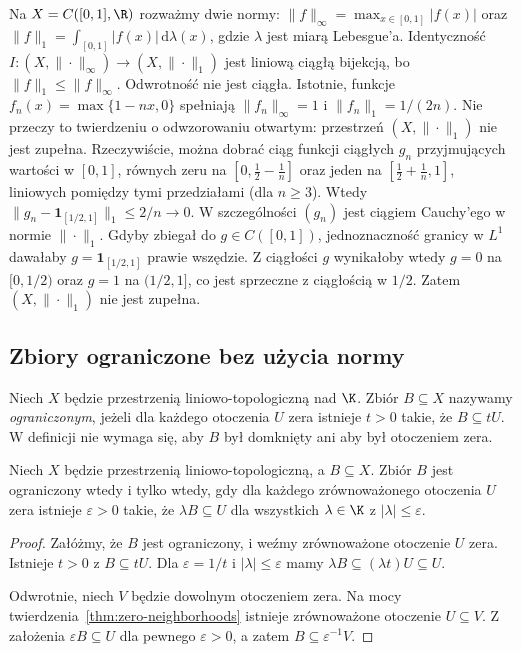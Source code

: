 \begin{przyklad}
Na $X=C([0,1],\R)$ rozważmy dwie normy:
$\|f\|_\infty=\max_{x\in[0,1]}|f(x)|$ oraz
$\|f\|_1=\int_{[0,1]}|f(x)|\,\mathrm d\lambda(x)$,
gdzie $\lambda$ jest miarą Lebesgue'a.
Identyczność $I\colon(X,\|\cdot\|_\infty)\to(X,\|\cdot\|_1)$
jest liniową ciągłą bijekcją, bo $\|f\|_1\leq\|f\|_\infty$.
Odwrotność nie jest ciągła. Istotnie, funkcje
$f_n(x)=\max\{1-nx,0\}$ spełniają $\|f_n\|_\infty=1$
i $\|f_n\|_1=1/(2n)$.
Nie przeczy to twierdzeniu o odwzorowaniu otwartym:
przestrzeń $(X,\|\cdot\|_1)$ nie jest zupełna. Rzeczywiście,
można dobrać ciąg funkcji ciągłych $g_n$ przyjmujących wartości
w $[0,1]$, równych zeru na $[0,\tfrac12-\tfrac1n]$ oraz jeden
na $[\tfrac12+\tfrac1n,1]$, liniowych pomiędzy tymi przedziałami
(dla $n\geq3$). Wtedy
$\|g_n-\mathbf1_{[1/2,1]}\|_1\leq2/n\to0$.
W szczególności $(g_n)$ jest ciągiem Cauchy'ego w normie
$\|\cdot\|_1$. Gdyby zbiegał do $g\in C([0,1])$,
jednoznaczność granicy w $L^1$ dawałaby
$g=\mathbf1_{[1/2,1]}$ prawie wszędzie. Z ciągłości $g$
wynikałoby wtedy $g=0$ na $[0,1/2)$ oraz $g=1$ na
$(1/2,1]$, co jest sprzeczne z ciągłością w $1/2$.
Zatem $(X,\|\cdot\|_1)$ nie jest zupełna.
\end{przyklad}

\subsection{Zbiory ograniczone bez użycia normy}

\begin{definicja}\label{def:tvs-bounded}
Niech $X$ będzie przestrzenią liniowo-topologiczną nad $\K$.
Zbiór $B\subseteq X$ nazywamy \emph{ograniczonym}, jeżeli
dla każdego otoczenia $U$ zera istnieje $t>0$ takie,
że $B\subseteq tU$. W definicji nie wymaga się, aby $B$
był domknięty ani aby był otoczeniem zera.
\end{definicja}

\begin{lemat}\label{lem:bounded-test}
Niech $X$ będzie przestrzenią liniowo-topologiczną, a $B\subseteq X$.
Zbiór $B$ jest ograniczony wtedy i tylko wtedy, gdy dla każdego
zrównoważonego otoczenia $U$ zera istnieje $\varepsilon>0$ takie,
że $\lambda B\subseteq U$ dla wszystkich $\lambda\in\K$
z $|\lambda|\leq\varepsilon$.
\end{lemat}
\begin{proof}
Załóżmy, że $B$ jest ograniczony, i weźmy zrównoważone
otoczenie $U$ zera. Istnieje $t>0$ z $B\subseteq tU$.
Dla $\varepsilon=1/t$ i $|\lambda|\leq\varepsilon$
mamy $\lambda B\subseteq(\lambda t)U\subseteq U$.

Odwrotnie, niech $V$ będzie dowolnym otoczeniem zera.
Na mocy twierdzenia~\ref{thm:zero-neighborhoods} istnieje
zrównoważone otoczenie $U\subseteq V$. Z założenia
$\varepsilon B\subseteq U$ dla pewnego $\varepsilon>0$,
a zatem $B\subseteq\varepsilon^{-1}V$.
\end{proof}

